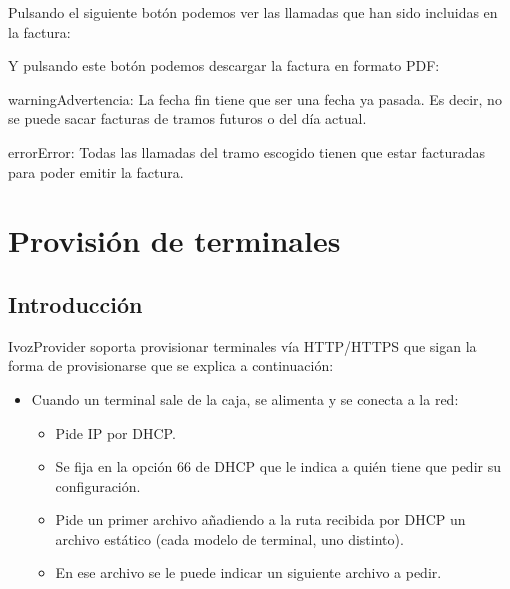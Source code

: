 \documentclass[letterpaper,10pt,spanish]{sphinxmanual}
\begin{document}
Pulsando el siguiente botón podemos ver las llamadas que han sido incluidas en la factura:


Y pulsando este botón podemos descargar la factura en formato PDF:


\begin{notice}{warning}{Advertencia:}
La fecha fin tiene que ser una fecha ya pasada. Es decir, no se puede sacar facturas de tramos futuros o del día actual.
\end{notice}

\begin{notice}{error}{Error:}
Todas las llamadas del tramo escogido tienen que estar facturadas para poder emitir la factura.
\end{notice}


\chapter{Provisión de terminales}
\label{provisioning/index:terminal-provisioning}\label{provisioning/index::doc}\label{provisioning/index:provisioning}

\section{Introducción}
\label{provisioning/index:overview}
IvozProvider soporta provisionar terminales vía HTTP/HTTPS que sigan la forma de provisionarse que se explica a continuación:
\begin{itemize}
\item {} 
Cuando un terminal sale de la caja, se alimenta y se conecta a la red:
\begin{itemize}
\item {} 
Pide IP por DHCP.

\item {} 
Se fija en la opción 66 de DHCP que le indica a quién tiene que pedir su configuración.

\item {} 
Pide un primer archivo añadiendo a la ruta recibida por DHCP un archivo estático (cada modelo de terminal, uno distinto).

\item {} 
En ese archivo se le puede indicar un siguiente archivo a pedir.

\end{itemize}

\end{itemize}
\end{document}

